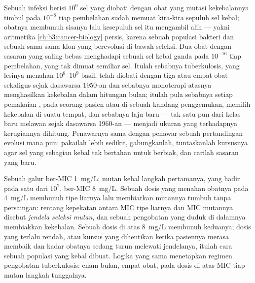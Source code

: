 \begin{proposition}\label{prop:b3:bacteriology:selection}
Sebuah infeksi berisi $10^{9}$ sel yang diobati dengan obat yang mutasi
kekebalannya timbul pada $10^{-8}$ tiap pembelahan sudah memuat
kira-kira sepuluh sel kebal; obatnya membunuh sisanya lalu kesepuluh sel itu
mengambil alih --- yakni aritmetika \cref{ch:b3:cancer-biology} persis, karena
sebuah populasi bakteri dan sebuah  sama-sama klon yang berevolusi di
bawah seleksi. Dua obat dengan sasaran yang saling bebas menghadapi sebuah sel
kebal ganda pada $10^{-16}$ tiap pembelahan, yang tak dimuat semiliar sel.
Itulah sebabnya tuberkulosis, yang lesinya menahan $10^{8}$--$10^{9}$ basil,
telah diobati dengan tiga atau empat obat sekaligus sejak dasawarsa 1950-an dan
sebabnya monoterapi atasnya menghasilkan kekebalan dalam hitungan bulan; itulah
pula sebabnya setiap pemakaian , pada seorang pasien atau di sebuah
kandang penggemukan, memilih kekebalan di suatu tempat, dan sebabnya laju
 baru --- tak satu pun dari kelas baru melawan  sejak
dasawarsa 1960-an --- menjadi ukuran yang terhadapnya kerugiannya dihitung.
Penawarnya sama dengan penawar sebuah pertandingan evolusi mana pun: pakailah
lebih sedikit, gabungkanlah, tuntaskanlah kursusnya agar sel yang sebagian
kebal tak bertahan untuk berbiak, dan carilah sasaran yang baru.
\end{proposition}

\begin{example}\label{ex:b3:bacteriology:window}
Sebuah galur ber-MIC \qty{1}{mg/L}; mutan kebal langkah pertamanya, yang hadir
pada satu dari $10^{7}$, ber-MIC \qty{8}{mg/L}. Sebuah dosis yang menahan
obatnya pada \qty{4}{mg/L} membunuh tipe liarnya lalu membiarkan mutannya
tumbuh tanpa persaingan: rentang kepekatan antara MIC tipe liarnya dan MIC
mutannya disebut \emph{jendela seleksi mutan}, dan sebuah pengobatan yang duduk
di dalamnya membiakkan kekebalan. Sebuah dosis di atas \qty{8}{mg/L} membunuh
keduanya; dosis yang terlalu rendah, atau kursus yang dihentikan ketika
pasiennya merasa membaik dan kadar obatnya sedang turun melewati jendelanya,
itulah cara sebuah populasi yang kebal dibuat. Logika yang sama menetapkan
regimen pengobatan tuberkulosis: enam bulan, empat obat, pada dosis di atas
MIC tiap mutan langkah tunggalnya.
\end{example}

